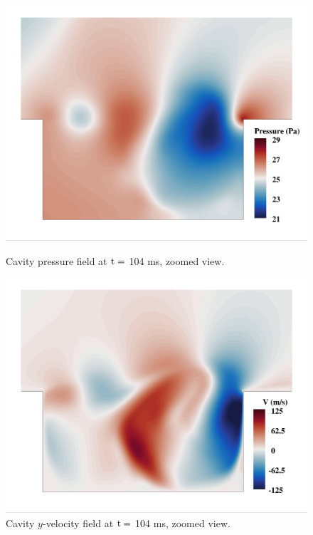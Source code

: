 \begin{figure}
	\begin{minipage}{0.48\linewidth}
		\includegraphics[width=0.99\linewidth,trim={0.5em 0.5em 0.5em 0.5em},clip]{Chapters/CavityAndCVRC/Images/cavity/pressure_example_zoom.png}
		\caption{\label{fig:cavityPressExampleZoom}Cavity pressure field at $\text{t} =$ 104 ms, zoomed view.}
	\end{minipage} \hspace{0.5em}
	\begin{minipage}{0.48\linewidth}
		\includegraphics[width=0.99\linewidth,trim={0.5em 0.5em 0.5em 0.5em},clip]{Chapters/CavityAndCVRC/Images/cavity/y_vel_example_zoom.png}
		\caption{\label{fig:cavityVExampleZoom}Cavity $y$-velocity field at $\text{t} =$ 104 ms, zoomed view.}
	\end{minipage}
\end{figure}

